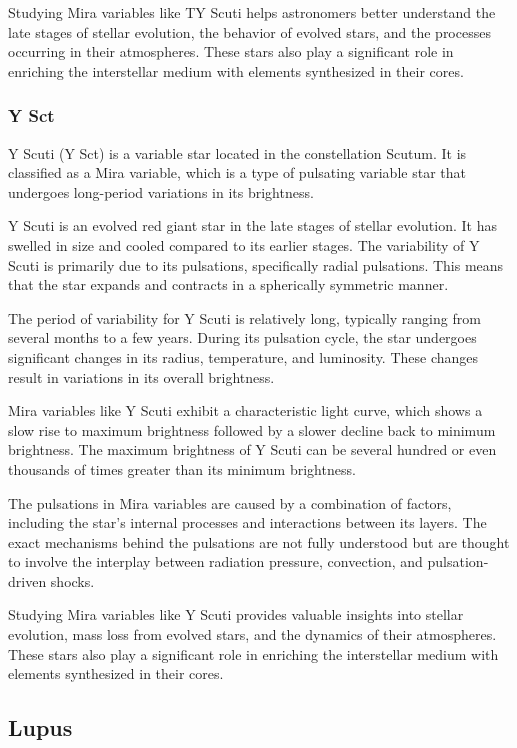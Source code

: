 Studying Mira variables like TY Scuti helps astronomers better understand the late stages of stellar evolution, the behavior of evolved stars, and the processes occurring in their atmospheres. These stars also play a significant role in enriching the interstellar medium with elements synthesized in their cores.


\subsubsection*{ Y Sct }
Y Scuti (Y Sct) is a variable star located in the constellation Scutum. It is classified as a Mira variable, which is a type of pulsating variable star that undergoes long-period variations in its brightness.

Y Scuti is an evolved red giant star in the late stages of stellar evolution. It has swelled in size and cooled compared to its earlier stages. The variability of Y Scuti is primarily due to its pulsations, specifically radial pulsations. This means that the star expands and contracts in a spherically symmetric manner.

The period of variability for Y Scuti is relatively long, typically ranging from several months to a few years. During its pulsation cycle, the star undergoes significant changes in its radius, temperature, and luminosity. These changes result in variations in its overall brightness.

Mira variables like Y Scuti exhibit a characteristic light curve, which shows a slow rise to maximum brightness followed by a slower decline back to minimum brightness. The maximum brightness of Y Scuti can be several hundred or even thousands of times greater than its minimum brightness.

The pulsations in Mira variables are caused by a combination of factors, including the star's internal processes and interactions between its layers. The exact mechanisms behind the pulsations are not fully understood but are thought to involve the interplay between radiation pressure, convection, and pulsation-driven shocks.

Studying Mira variables like Y Scuti provides valuable insights into stellar evolution, mass loss from evolved stars, and the dynamics of their atmospheres. These stars also play a significant role in enriching the interstellar medium with elements synthesized in their cores.

\subsection{Lupus}
